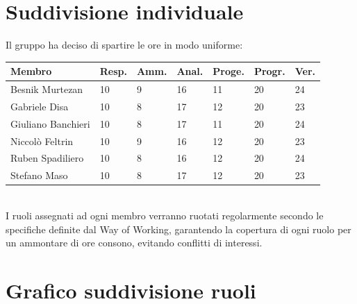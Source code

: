 \documentclass[a4paper,10pt]{article}
\begin{document}
\section*{Suddivisione individuale}
Il gruppo ha deciso di spartire le ore in modo uniforme:
\begin{table}[h!]
\centering
\begin{tabular}{|p{3.1cm}|M{1.2cm}|M{1.2cm}|M{1.2cm}|M{1.2cm}|M{1.2cm}|M{1.2cm}|}
  \hline
  \textbf{Membro} & \textbf{Resp.} & \textbf{Amm.} & \textbf{Anal.} & \textbf{Proge.} & \textbf{Progr.} & \textbf{Ver.} \\
  \hline
  Besnik Murtezan & 10 & 9 & 16 & 11 & 20 & 24 \\
  \hline
  Gabriele Disa & 10 & 8 & 17 & 12 & 20 & 23 \\
  \hline
  Giuliano Banchieri & 10 & 8 & 17 & 11 & 20 & 24 \\
  \hline
  Niccolò Feltrin & 10 & 9 & 16 & 12 & 20 & 23 \\
  \hline
  Ruben Spadiliero & 10 & 8 & 16 & 12 & 20 & 24 \\
  \hline
  Stefano Maso & 10 & 8 & 17 & 12 & 20 & 23 \\
  \hline
\end{tabular}
\end{table} \\
I ruoli assegnati ad ogni membro verranno ruotati regolarmente secondo le specifiche definite dal Way of Working, garantendo la copertura di ogni ruolo per un ammontare di ore consono, evitando conflitti di interessi. 

\section*{Grafico suddivisione ruoli}

\vspace{1\baselineskip}
\vspace{1\baselineskip}

\begin{center}
\end{center}
\end{document}
